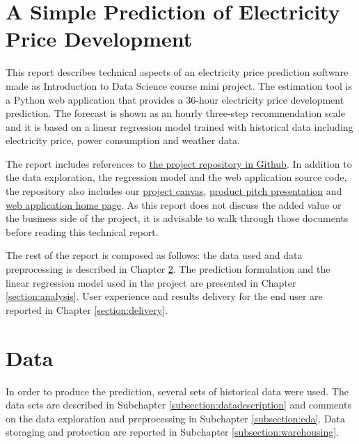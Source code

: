 \documentclass{article}
\begin{document}


\tableofcontents

\vspace{30.0 cm}

\section{A Simple Prediction of Electricity Price Development}
\label{section:introduction}

This report describes technical aspects of an electricity price prediction software made as Introduction to Data Science course mini project. The estimation tool is a Python web application that provides a 36-hour electricity price development prediction. The forecast is shown as an hourly three-step recommendation scale and it is based on a linear regression model trained with historical data including electricity price, power consumption and weather data.

The report includes references to \href{https://github.com/IDS-mini/electricity}{the project repository in Github}. In addition to the data exploration, the regression model and the web application source code, the repository also includes our \href{https://github.com/IDS-mini/electricity/blob/main/marketing/Mini-Project-Canvas-Hedlund-Korpi-Ranta.pdf}{project canvas}, \href{https://github.com/IDS-mini/electricity/blob/main/marketing/presentation.pptx}{product pitch presentation} and \href{https://github.com/IDS-mini/electricity/blob/main/src/app/templates/index.html}{web application home page}. As this report does not discuss the added value or the business side of the project, it is advisable to walk through those documents before reading this technical report.

The rest of the report is composed as follows: the data used and data preprocessing is described in Chapter \ref{section:data}. The prediction formulation and the linear regression model used in the project are presented in Chapter \ref{section:analysis}. User experience and results delivery for the end user are reported in Chapter \ref{section:delivery}.

\section{Data}
\label{section:data}

In order to produce the prediction, several sets of historical data were used. The data sets are described in Subchapter \ref{subsection:datadescription} and comments on the data exploration and preprocessing in Subchapter \ref{subsection:eda}. Data storaging and protection are reported in Subchapter \ref{subsection:warehousing}.
\end{document}
